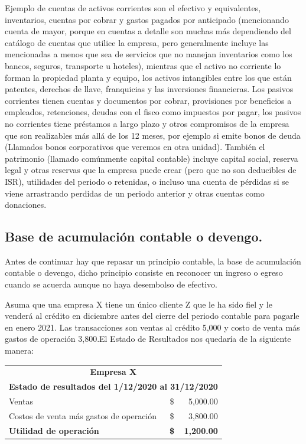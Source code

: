 \documentclass[12pt, a4paper]{article}
\begin{document}
Ejemplo de cuentas de activos corrientes son el efectivo y equivalentes, inventarios, cuentas por cobrar y gastos pagados por anticipado (mencionando cuenta de mayor, porque en cuentas a detalle son muchas más dependiendo del catálogo de cuentas que utilice la empresa, pero generalmente incluye las mencionadas a menos que sea de servicios que no manejan inventarios como los bancos, seguros, transporte u hoteles), mientras que el activo no corriente lo forman la propiedad planta y equipo, los activos intangibles entre los que están patentes, derechos de llave, franquicias y las inversiones financieras. Los pasivos corrientes tienen cuentas y documentos por cobrar, provisiones por beneficios a empleados, retenciones, deudas con el fisco como impuestos por pagar, los pasivos no corrientes tiene préstamos a largo plazo y otros compromisos de la empresa que son realizables más allá de los 12 meses, por ejemplo si emite bonos de deuda (Llamados bonos corporativos que veremos en otra unidad). También el patrimonio (llamado comúnmente capital contable) incluye capital social, reserva legal y otras reservas que la empresa puede crear (pero que no son deducibles de ISR), utilidades del periodo o retenidas, o incluso una cuenta de pérdidas si se viene arrastrando perdidas de un periodo anterior y otras cuentas como donaciones.

\subsection{Base de acumulación contable o devengo.}

Antes de continuar hay que repasar un principio contable, la base de acumulación contable o devengo, dicho principio consiste en reconocer un ingreso o egreso cuando se acuerda aunque no haya desembolso de efectivo.

Asuma que una empresa X tiene un único cliente Z que le ha sido fiel y le venderá al crédito en diciembre antes del cierre del periodo contable para pagarle en enero 2021. Las transacciones son ventas al crédito 5,000 y costo de venta más gastos de operación 3,800.El Estado de Resultados nos quedaría de la siguiente manera:

\begin{center}
\begin{tabular}{|l|c|r|}
\hline
\multicolumn{3}{|c|}{\textbf{Empresa X}} \\
\multicolumn{3}{|c|}{\textbf{Estado de resultados del 1/12/2020 al 31/12/2020}} \\
\hline
Ventas & \$ & 5,000.00 \\
\hline
Costos de venta más gastos de operación & \$ & 3,800.00 \\
\hline
\textbf{Utilidad de operación} & \textbf{\$} & \textbf{1,200.00} \\
\hline
\end{tabular}
\end{center}
\end{document}
